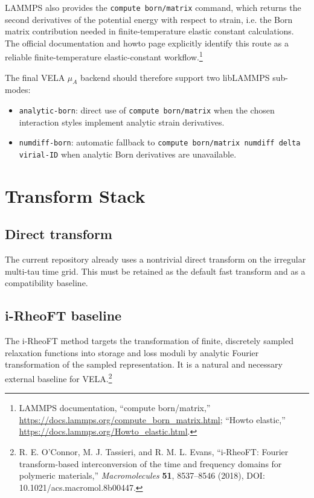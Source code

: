 \documentclass[11pt]{article}
\begin{document}
LAMMPS also provides the \texttt{compute born/matrix} command, which returns the second derivatives of the potential energy with respect to strain, i.e. the Born matrix contribution needed in finite-temperature elastic constant calculations. The official documentation and howto page explicitly identify this route as a reliable finite-temperature elastic-constant workflow.\footnote{LAMMPS documentation, ``compute born/matrix,'' \url{https://docs.lammps.org/compute_born_matrix.html}; ``Howto elastic,'' \url{https://docs.lammps.org/Howto_elastic.html}.}

The final VELA $\mu_A$ backend should therefore support two libLAMMPS sub-modes:
\begin{itemize}[leftmargin=2em]
  \item \texttt{analytic-born}: direct use of \texttt{compute born/matrix} when the chosen interaction styles implement analytic strain derivatives.
  \item \texttt{numdiff-born}: automatic fallback to \texttt{compute born/matrix numdiff delta virial-ID} when analytic Born derivatives are unavailable.
\end{itemize}

\section{Transform Stack}

\subsection{Direct transform}
The current repository already uses a nontrivial direct transform on the irregular multi-tau time grid. This must be retained as the default fast transform and as a compatibility baseline.

\subsection{i-RheoFT baseline}
The i-RheoFT method targets the transformation of finite, discretely sampled relaxation functions into storage and loss moduli by analytic Fourier transformation of the sampled representation. It is a natural and necessary external baseline for VELA.\footnote{R. E. O'Connor, M. J. Tassieri, and R. M. L. Evans, ``i-RheoFT: Fourier transform-based interconversion of the time and frequency domains for polymeric materials,'' \emph{Macromolecules} \textbf{51}, 8537--8546 (2018), DOI: 10.1021/acs.macromol.8b00447.}
\end{document}
